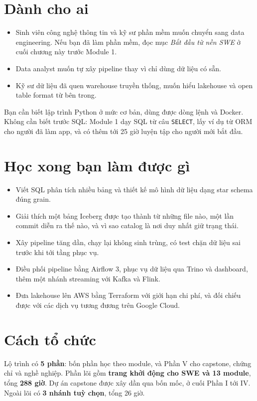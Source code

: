 \documentclass[11pt,a4paper,oneside]{report}
\newcommand{\code}[1]{\texttt{#1}}
\begin{document}
\section{Dành cho ai}
\begin{itemize}
  \item Sinh viên công nghệ thông tin và kỹ sư phần mềm muốn chuyển sang data engineering. Nếu bạn đã làm phần mềm, đọc mục \textit{Bắt đầu từ nền SWE} ở cuối chương này trước Module 1.
  \item Data analyst muốn tự xây pipeline thay vì chỉ dùng dữ liệu có sẵn.
  \item Kỹ sư dữ liệu đã quen warehouse truyền thống, muốn hiểu lakehouse và open table format từ bên trong.
\end{itemize}
Bạn cần biết lập trình Python ở mức cơ bản, dùng được dòng lệnh và Docker. Không cần biết trước SQL: Module 1 dạy SQL từ câu \code{SELECT}, lấy ví dụ từ ORM cho người đã làm app, và có thêm tới 25 giờ luyện tập cho người mới bắt đầu.

\section{Học xong bạn làm được gì}
\begin{itemize}
  \item Viết SQL phân tích nhiều bảng và thiết kế mô hình dữ liệu dạng star schema đúng grain.
  \item Giải thích một bảng Iceberg được tạo thành từ những file nào, một lần commit diễn ra thế nào, và vì sao catalog là nơi duy nhất giữ trạng thái.
  \item Xây pipeline tăng dần, chạy lại không sinh trùng, có test chặn dữ liệu sai trước khi tới tầng phục vụ.
  \item Điều phối pipeline bằng Airflow 3, phục vụ dữ liệu qua Trino và dashboard, thêm một nhánh streaming với Kafka và Flink.
  \item Đưa lakehouse lên AWS bằng Terraform với giới hạn chi phí, và đối chiếu được với các dịch vụ tương đương trên Google Cloud.
\end{itemize}

\section{Cách tổ chức}
Lộ trình có \textbf{5 phần}: bốn phần học theo module, và Phần V cho capstone, chứng chỉ và nghề nghiệp. Phần lõi gồm \textbf{trang khởi động cho SWE và 13 module}, tổng \textbf{288 giờ}. Dự án capstone được xây dần qua bốn mốc, ở cuối Phần I tới IV. Ngoài lõi có \textbf{3 nhánh tuỳ chọn}, tổng 26 giờ.
\end{document}
